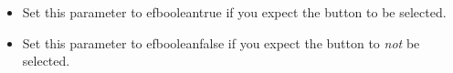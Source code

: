\begin{itemize}
\item Set this parameter to \app{}efbooleantrue{} if you expect the button to be  selected.
\item Set this parameter to \app{}efbooleanfalse{} if you expect the button to \emph{not} be selected.
\end{itemize}

